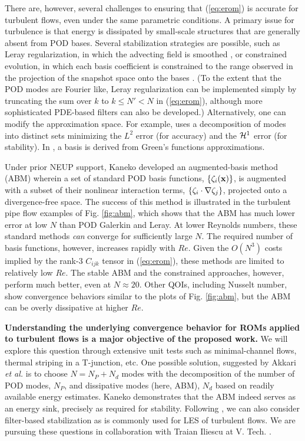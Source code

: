 There are, however, several challenges to ensuring that (\ref{eq:erom})
is accurate for turbulent flows, even under the same parametric conditions.
A primary issue for turbulence is that energy is dissipated by small-scale
structures that are generally absent from POD bases.  Several stabilization
strategies are possible, such as Leray regularization, in which the advecting
field is smoothed \cite{wang2012proper}, or constrained evolution, in which
each basis coefficient is constrained to the range observed in the projection
of the snapshot space onto the bases \cite{fick18}.  (To the extent that the
POD modes are Fourier like, Leray regularization can be implemented simply by
truncating the sum over $k$ to $k \leq N' < N$ in (\ref{eq:erom}), although
more sophisticated PDE-based filters can also be developed.) Alternatively,
one can modify the approximation space.  For example,
\cite{akkari19} uses a decomposition of modes into distinct sets minimizing the
$L^2$ error (for accuracy) and the ${\cal H}^1$ error (for stability).  In
\cite{khodkar2019}, a basis is derived from Green's functions approximations.

   Under prior NEUP support, Kaneko \cite{kaneko22a,kaneko22} developed an
augmented-basis method (ABM) wherein a set of standard POD basis functions,
$\{\mathbf{\zeta}_i(\mathbf{x}) \}$,  is augmented with a subset of their nonlinear
interaction terms, $\{\mathbf{\zeta}_i \cdot \nabla \mathbf{\zeta}_j\}$, projected onto
a divergence-free space.  The success of this
method is illustrated in the turbulent pipe flow examples of Fig. \ref{fig:abm},
which shows that the ABM has much lower error at low $N$ than POD Galerkin and
Leray.  At lower Reynolds numbers, these standard methods {\em can} converge 
for sufficiently large $N$.  The required number of basis functions, however,
increases rapidly with $Re$.  Given the $O(N^3)$ costs implied by the rank-3
$C_{ijk}$ tensor in (\ref{eq:erom}), these methods are limited to relatively
low $Re$.  The stable ABM and the constrained approaches, however, perform much better,
even at $N\approx 20$.  Other QOIs, including Nusselt number, show convergence
behaviors similar to the plots of Fig. \ref{fig:abm}, but the ABM can be overly
dissipative at higher $Re$.  

\textbf{Understanding the
underlying convergence behavior for ROMs applied to turbulent flows is a major
objective of the proposed work.} We will explore this question through
extensive unit tests such as minimal-channel flows, thermal striping in a
T-junction, etc.
  One possible solution, suggested by Akkari {\em et al.} \cite{akkari19} is to
choose $N=N_P + N_d$ modes with the decomposition of the number
of POD modes, $N_P$, and dissipative modes (here, ABM), $N_d$ based on
readily available energy estimates.  
Kaneko \cite{kaneko22a,kaneko22} demonstrates that the ABM indeed serves as an
energy sink, precisely as required for stability.
  Following \cite{wang2012proper}, we can also consider filter-based
stabilization as is commonly used for LES of turbulent flows.  We are 
pursuing these questions in collaboration with Traian Iliescu at V. Tech.
\cite{mou2021}.

